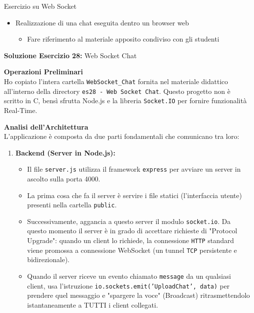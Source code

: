 \documentclass[11pt]{article}
\begin{document}
\begin{tcolorbox}[colback=blue!5!white,colframe=blue!75!black,title=\textbf{DOMANDA}, breakable]
Esercizio su Web Socket
\begin{itemize}
    \item Realizzazione di una chat eseguita dentro un browser web
    \begin{itemize}
        \item Fare riferimento al materiale apposito condiviso con gli studenti
    \end{itemize}
\end{itemize}
\end{tcolorbox}

\begin{tcolorbox}[colback=green!5!white,colframe=green!75!black,title=\textbf{RISPOSTA}, breakable]
\textbf{Soluzione Esercizio 28:} Web Socket Chat

\textbf{Operazioni Preliminari}\\
Ho copiato l'intera cartella \texttt{WebSocket\_Chat} fornita nel materiale didattico all'interno della directory \texttt{es28 - Web Socket Chat}. Questo progetto non è scritto in C, bensì sfrutta Node.js e la libreria \texttt{Socket.IO} per fornire funzionalità Real-Time.

\textbf{Analisi dell'Architettura}\\
L'applicazione è composta da due parti fondamentali che comunicano tra loro:

\begin{enumerate}
    \item \textbf{Backend (Server in Node.js):}
    \begin{itemize}
        \item Il file \texttt{server.js} utilizza il framework \texttt{express} per avviare un server in ascolto sulla porta 4000.
        \item La prima cosa che fa il server è servire i file statici (l'interfaccia utente) presenti nella cartella \texttt{public}.
        \item Successivamente, aggancia a questo server il modulo \texttt{socket.io}. Da questo momento il server è in grado di accettare richieste di "Protocol Upgrade": quando un client lo richiede, la connessione \texttt{HTTP} standard viene promossa a connessione WebSocket (un tunnel \texttt{TCP} persistente e bidirezionale).
        \item Quando il server riceve un evento chiamato \texttt{message} da un qualsiasi client, usa l'istruzione \texttt{io.sockets.emit('UploadChat', data)} per prendere quel messaggio e "spargere la voce" (Broadcast) ritrasmettendolo istantaneamente a TUTTI i client collegati.
    \end{itemize}


\end{enumerate}
\end{tcolorbox}
\end{document}
